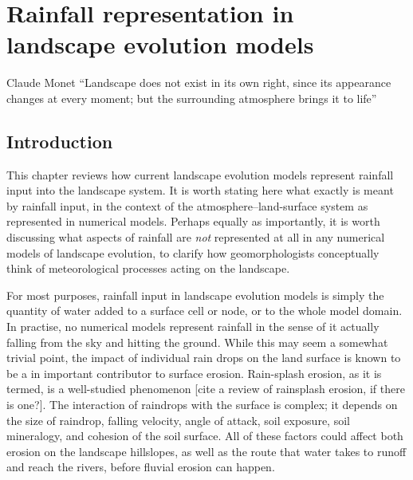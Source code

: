\chapter{Rainfall representation in landscape evolution models}
\label{chapter_RainfallInLEMs}

\begin{chapquote}{Claude Monet \textit{}}
``Landscape does not exist in its own right, since its appearance changes at every moment; but the surrounding atmosphere brings it to life'' 
\end{chapquote}

\section{Introduction}
This chapter reviews how current landscape evolution models represent rainfall input into the landscape system. It is worth stating here what exactly is meant by rainfall input, in the context of the atmosphere--land-surface system as represented in numerical models. Perhaps equally as importantly, it is worth discussing what aspects of rainfall are \textit{not} represented at all in any numerical models of landscape evolution, to clarify how geomorphologists conceptually think of meteorological processes acting on the landscape.

For most purposes, rainfall input in landscape evolution models is simply the quantity of water added to a surface cell or node, or to the whole model domain. In practise, no numerical models represent rainfall in the sense of it actually falling from the sky and hitting the ground. While this may seem a somewhat trivial point, the impact of individual rain drops on the land surface is known to be a in important contributor to surface erosion. Rain-splash erosion, as it is termed, is a well-studied phenomenon [cite a review of rainsplash erosion, if there is one?]. The interaction of raindrops with the surface is complex; it depends on the size of raindrop, falling velocity, angle of attack, soil exposure, soil mineralogy, and cohesion of the soil surface. All of these factors could affect both erosion on the landscape hillslopes, as well as the route that water takes to runoff and reach the rivers, before fluvial erosion can happen.


